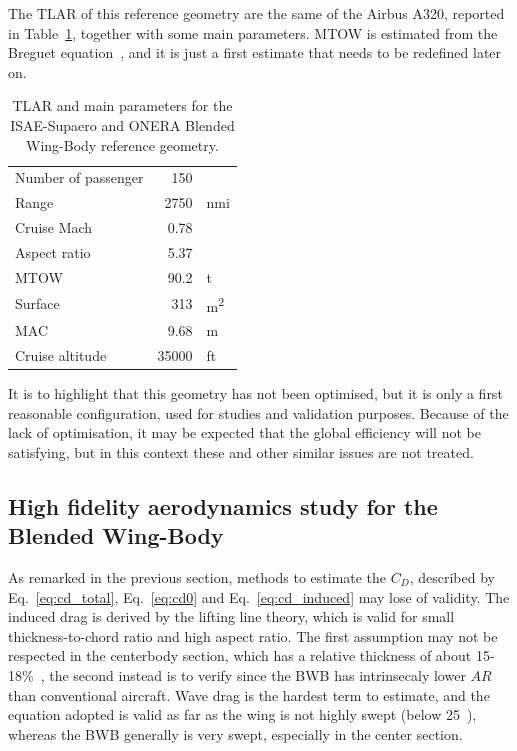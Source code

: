 The TLAR of this reference geometry are the same of the Airbus A320, reported in Table~\ref{tab:bwb_ref_geometry_tlar}, together with some main parameters.
MTOW is estimated from the Breguet equation~\cite{bib:roskam_partI}, and it is just a first estimate that needs to be redefined later on.
\begin{table}[!h]
	\centering
	\begin{tabular}{l r l}
		\hline
		Number of passenger & 150 & \\
		Range & 2750 & nmi \\
		Cruise Mach & 0.78 & \\
		Aspect ratio & 5.37 & \\
		MTOW & 90.2 & \si{\tonne} \\
		Surface & 313 & \si{\square\meter} \\
		MAC & 9.68 & \si{\meter} \\
		Cruise altitude & 35000 & ft \\
		\hline
	\end{tabular}
	\caption{TLAR and main parameters for the ISAE-Supaero and ONERA Blended Wing-Body reference geometry.}
	\label{tab:bwb_ref_geometry_tlar}
\end{table}
It is to highlight that this geometry has not been optimised, but it is only a first reasonable configuration, used for studies and validation purposes.
Because of the lack of optimisation, it may be expected that the global efficiency will not be satisfying, but in this context these and other similar issues are not treated. 

\subsection{High fidelity aerodynamics study for the Blended Wing-Body}
\label{subsec:chap4_bwb_aero_cfd}

As remarked in the previous section, methods to estimate the $C_D$, described by Eq.~\eqref{eq:cd_total}, Eq.~\eqref{eq:cd0} and Eq.~\eqref{eq:cd_induced} may lose of validity.
The induced drag is derived by the lifting line theory, which is valid for small thickness-to-chord ratio and high aspect ratio. 
The first assumption may not be respected in the centerbody section, which has a relative thickness of about 15-18\%~\cite{bib:kozek}, the second instead is to verify since the BWB has intrinsecaly lower $AR$ than conventional aircraft.  
Wave drag is the hardest term to estimate, and the equation adopted is valid as far as the wing is not highly swept (below 25~\si{\deg}), whereas the BWB generally is very swept, especially in the center section. 

